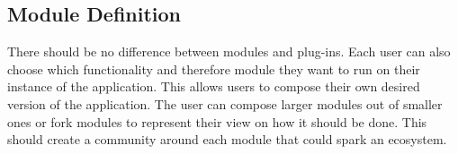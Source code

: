 
\subsection*{Module Definition}

There should be no difference between modules and plug-ins. Each user can also choose which functionality and therefore module they want to run on their instance of the application. This allows users to compose their own desired version of the application. The user can compose larger modules out of smaller ones or fork modules to represent their view on how it should be done. This should create a community around each module that could spark an ecosystem.



